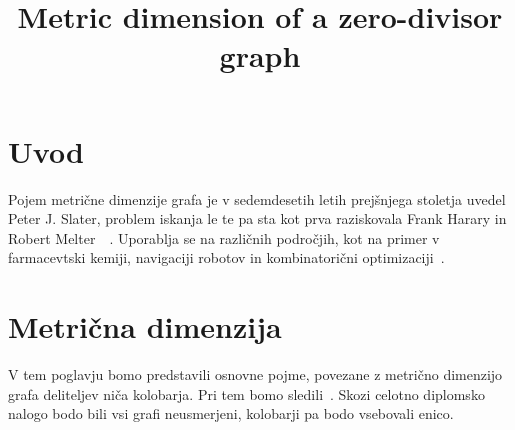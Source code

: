 \documentclass[mat1, tisk]{fmfdelo}
\title{Metric dimension of a zero-divisor graph}
\begin{document}
\section{Uvod}


Pojem metrične dimenzije grafa je v sedemdesetih letih prejšnjega stoletja 
uvedel Peter J. Slater, problem iskanja le te pa sta kot prva raziskovala 
Frank Harary in Robert Melter~\cite{7dolzan}~\cite{4pirzada17}. Uporablja se 
na različnih področjih, kot na primer v farmacevtski kemiji, navigaciji 
robotov in kombinatorični optimizaciji~\cite{0OuSh}.
%
%
\section{Metrična dimenzija}
V tem poglavju bomo predstavili osnovne pojme, povezane z metrično dimenzijo grafa 
deliteljev niča kolobarja. Pri tem bomo sledili~\cite{0OuSh}. Skozi celotno diplomsko nalogo 
bodo bili vsi grafi neusmerjeni, kolobarji pa bodo vsebovali enico.
%
\end{document}
